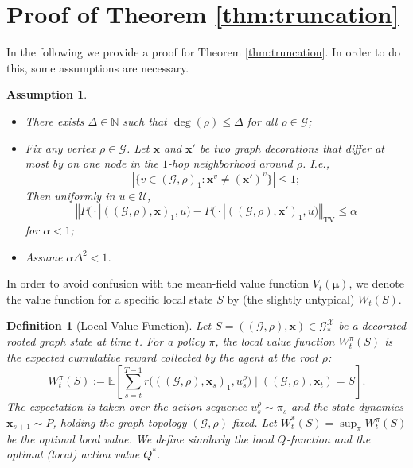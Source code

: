 \documentclass{article}
\newtheorem{definition}{Definition}
\newtheorem{assumption}{Assumption}
\begin{document}
\section{Proof of Theorem \ref{thm:truncation}}

In the following we provide a proof for Theorem \ref{thm:truncation}. In order to do this, some assumptions are necessary.
\begin{assumption} 
\label{ass:error_propagation_gnn}
    \leavevmode\par
    \begin{itemize}
        \item There exists $\Delta \in \mathbb N$ such that  $\deg (\rho) \le \Delta$ for all $\rho \in \mathcal G$;
        \item  Fix any vertex $\rho  \in \mathcal G$. Let $\mathbf x$ and $\mathbf x'$ be two graph decorations that differ at most by on one node in the $1$-hop neighborhood around $\rho$. I.e.,
        $$ |\{v \in (\mathcal G,\rho)_1  : \mathbf{x}^v \neq (\mathbf{x}')^v \}| \le 1;$$
        Then uniformly in $u \in \mathcal U$,
        $$\left\Vert P \big(\cdot | ( (\mathcal G,\rho), \mathbf{x})_1 ,u \big) - P \big(\cdot | ( (\mathcal G,\rho), \mathbf{x}')_1 ,u \big)  \right\Vert_{\mathrm{TV}} \le \alpha$$
        for $\alpha <1$;
        \item Assume $\alpha\Delta^2 < 1$.
    \end{itemize}
\end{assumption}
In order to avoid confusion with the mean-field value function $V_t(\boldsymbol{\mu})$, we denote the value function for a specific local state $S$ by (the slightly untypical) $W_t(S)$.
\begin{definition}[Local Value Function]
    Let $S = ((\mathcal{G}, \rho), \mathbf{x}) \in \mathcal{G}_*^{\mathcal{X}}$ be a decorated rooted graph state at time $t$. For a policy $\pi$, the local value function $W_t^\pi(S)$ is the expected cumulative reward collected by the agent at the root $\rho$:
    \[
    W_t^\pi(S) := \mathbb{E} \left[ \sum_{s=t}^{T-1} r\big( ((\mathcal{G}, \rho), \mathbf{x}_s)_1, u_s^\rho \big) \;\bigg|\; ((\mathcal{G}, \rho), \mathbf{x}_t) = S \right].
    \]
    The expectation is taken over the action sequence $u_s^\rho \sim \pi_s$ and the state dynamics $\mathbf{x}_{s+1} \sim P$, holding the graph topology $(\mathcal{G}, \rho)$ fixed. Let $W_t^*(S) = \sup_\pi W_t^\pi(S)$ be the optimal local value. We define similarly the local $Q$-function and the optimal (local) action value $Q^*$.
\end{definition}
\end{document}
